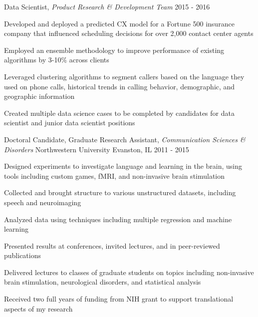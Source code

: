 \begin{cventries}
  \cventry
    {Data Scientist, \textit{Product Research \& Development Team}} %
    {} %
    {} %
    {2015 - 2016} %
    {
      \begin{cvitems} %
        \item {Developed and deployed a predicted CX model for a Fortune 500 insurance company that influenced scheduling decisions for over 2,000 contact center agents}
        \item {Employed an ensemble methodology to improve performance of existing algorithms by 3-10\% across clients}
        \item {Leveraged clustering algorithms to segment callers based on the language they used on phone calls, historical trends in calling behavior, demographic, and geographic information}
        \item {Created multiple data science cases to be completed by candidates for data scientist and junior data scientist positions}
      \end{cvitems}
    }

  \cventry
    {Doctoral Candidate, Graduate Research Assistant, \textit{Communication Sciences \& Disorders}} %
    {Northwestern University} %
    {Evanston, IL} %
    {2011 - 2015} %
    {
      \begin{cvitems}
      \item {Designed experiments to investigate language and learning in the brain, using tools including custom games, fMRI, and non-invasive brain stimulation}
      \item {Collected and brought structure to various unstructured datasets, including speech and neuroimaging}
      \item {Analyzed data using techniques including multiple regression and machine learning}
      \item {Presented results at conferences, invited lectures, and in peer-reviewed publications}
      \item {Delivered lectures to classes of graduate students on topics including non-invasive brain stimulation, neurological disorders, and statistical analysis}
      \item {Received two full years of funding from NIH grant to support translational aspects of my research}
      \end{cvitems}
    }


\end{cventries}
